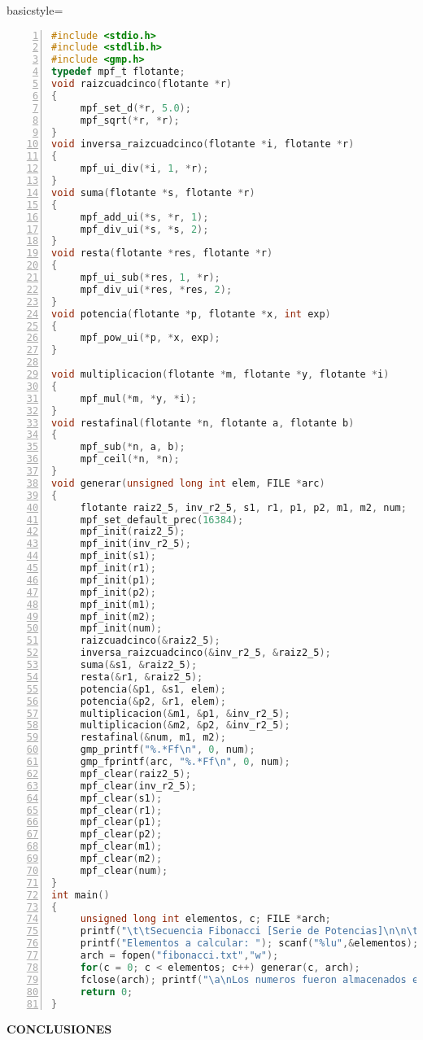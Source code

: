 \documentclass[letterpaper]{article}
\begin{document}
\lstset
{
basicstyle=\scriptsize
}
\begin{lstlisting}[language=C, numbers=left, showstringspaces=false, tabsize=3]
#include <stdio.h>
#include <stdlib.h>
#include <gmp.h>
typedef mpf_t flotante;
void raizcuadcinco(flotante *r)
{
     mpf_set_d(*r, 5.0);
     mpf_sqrt(*r, *r);
}
void inversa_raizcuadcinco(flotante *i, flotante *r)
{
     mpf_ui_div(*i, 1, *r);
}
void suma(flotante *s, flotante *r)
{
     mpf_add_ui(*s, *r, 1);
     mpf_div_ui(*s, *s, 2);
}
void resta(flotante *res, flotante *r)
{
     mpf_ui_sub(*res, 1, *r);
     mpf_div_ui(*res, *res, 2);
}
void potencia(flotante *p, flotante *x, int exp)
{
     mpf_pow_ui(*p, *x, exp);
}

void multiplicacion(flotante *m, flotante *y, flotante *i)
{
     mpf_mul(*m, *y, *i);
}
void restafinal(flotante *n, flotante a, flotante b)
{
     mpf_sub(*n, a, b);
     mpf_ceil(*n, *n);
}
void generar(unsigned long int elem, FILE *arc)
{
     flotante raiz2_5, inv_r2_5, s1, r1, p1, p2, m1, m2, num;
     mpf_set_default_prec(16384);
     mpf_init(raiz2_5);
     mpf_init(inv_r2_5);
     mpf_init(s1);
     mpf_init(r1);
     mpf_init(p1);
     mpf_init(p2);
     mpf_init(m1);
     mpf_init(m2);
     mpf_init(num);
     raizcuadcinco(&raiz2_5);
     inversa_raizcuadcinco(&inv_r2_5, &raiz2_5);
     suma(&s1, &raiz2_5);
     resta(&r1, &raiz2_5);
     potencia(&p1, &s1, elem);
     potencia(&p2, &r1, elem);
     multiplicacion(&m1, &p1, &inv_r2_5);
     multiplicacion(&m2, &p2, &inv_r2_5);
     restafinal(&num, m1, m2);
     gmp_printf("%.*Ff\n", 0, num);
     gmp_fprintf(arc, "%.*Ff\n", 0, num);
     mpf_clear(raiz2_5);
     mpf_clear(inv_r2_5);
     mpf_clear(s1);
     mpf_clear(r1);
     mpf_clear(p1);
     mpf_clear(p2);
     mpf_clear(m1);
     mpf_clear(m2);
     mpf_clear(num);
}
int main()
{
     unsigned long int elementos, c; FILE *arch;
     printf("\t\tSecuencia Fibonacci [Serie de Potencias]\n\n\t\t\tOrtega O. Eder - 1CM4\n\n\n");
     printf("Elementos a calcular: "); scanf("%lu",&elementos); printf("\n");
     arch = fopen("fibonacci.txt","w");
     for(c = 0; c < elementos; c++) generar(c, arch);
     fclose(arch); printf("\a\nLos numeros fueron almacenados en \"fibonacci.txt\"");
     return 0;
}
\end{lstlisting}
\clearpage

\begin{center}
\textbf{\LARGE CONCLUSIONES\\}
\vspace{1.0cm}
\end{center}
\end{document}
